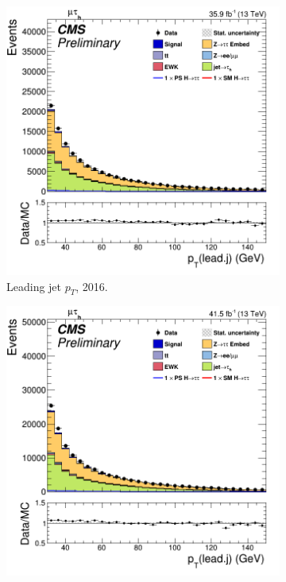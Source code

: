 \begin{figure}
  \begin{subfigure}[b]{0.33\linewidth}
    \centering
    \includegraphics[width=\linewidth]{Chapitre7/Images/CtrlPlots/2016/LeadingJetpT.png} 
    \caption{Leading jet $p_T$, 2016.} 
    \vspace{0.5ex}
  \end{subfigure}%
  \begin{subfigure}[b]{0.33\linewidth}
    \centering
    \includegraphics[width=\linewidth]{Chapitre7/Images/CtrlPlots/2017/LeadingJetpT.png} 

\end{subfigure}
\end{figure}
